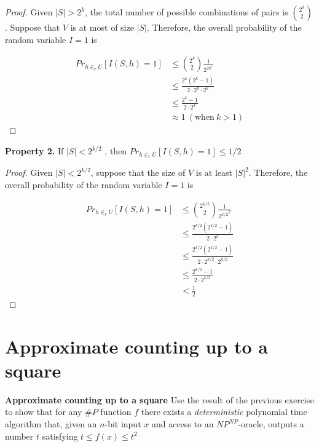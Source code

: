 \documentclass[12pt, a4paper]{article} %
\theoremstyle{definition}
\begin{document}
\begin{proof}


  Given $|S| >  2^k$, the total number of possible combinations of pairs is $\binom{2^k}{2}$.
  Suppose that $V$ is at most of size $|S|$.
  Therefore, the overall probability of the random variable $I = 1$ is

  \begin{align*}
    Pr_{h \in_r U} [I(S,h) = 1] &\leq \binom{2^k}{2}\frac{1}{2^{2k^1}}\\
                                &\leq \frac{2^k(2^k - 1)}{2 \cdot 2^k \cdot 2^k}\\
                                &\leq \frac{2^k - 1}{2 \cdot 2^k}\\
                                &\approx 1 \ (\text{when} \ k > 1)
  \end{align*}

\end{proof}

\newpage

\textbf{Property 2.} \quad If $|S| < 2^{k/2}$ , then $Pr_{h \in_r U} [I(S,h) = 1] \leq 1/2$

\begin{proof}


  Given $|S| <  2^{k/2}$, suppose that the size of $V$ is at least $|S|^2$.
  Therefore, the overall probability of the random variable $I = 1$ is

  \begin{align*}
    Pr_{h \in_r U} [I(S,h) = 1] &\leq \binom{2^{k/2}}{2}\frac{1}{{2^{k/2}}^2}\\
                                &\leq \frac{2^{k/2}(2^{k/2} - 1)}{2 \cdot 2^k}\\
                                &\leq \frac{2^{k/2}(2^{k/2} - 1)}{2 \cdot 2^{k/2} \cdot 2^{k/2}}\\
                                &\leq \frac{2^{k/2} - 1}{2 \cdot 2^{k/2}}\\
                                &< \frac{1}{2}
  \end{align*}


\end{proof}


\section{Approximate counting up to a square}

\textbf{Approximate counting up to a square} \quad Use the result of the previous exercise to show that for any $\#P$ function $f$ there exists a \textit{deterministic} polynomial time algorithm that, given an $n$-bit input $x$ and access to an $NP^{NP}$-oracle, outputs a number $t$ satisfying $t \leq f(x) \leq t^2$
\end{document}
